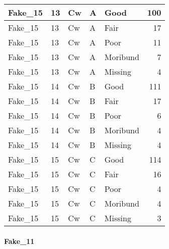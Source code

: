 \documentclass[
]{article}
\begin{document}
\begin{tabular}{l|l|l|l|l|r}
\hline
Fake\_15 & 13 & Cw & A & Good & 100\\
\hline
Fake\_15 & 13 & Cw & A & Fair & 17\\
\hline
Fake\_15 & 13 & Cw & A & Poor & 11\\
\hline
Fake\_15 & 13 & Cw & A & Moribund & 7\\
\hline
Fake\_15 & 13 & Cw & A & Missing & 4\\
\hline
Fake\_15 & 14 & Cw & B & Good & 111\\
\hline
Fake\_15 & 14 & Cw & B & Fair & 17\\
\hline
Fake\_15 & 14 & Cw & B & Poor & 6\\
\hline
Fake\_15 & 14 & Cw & B & Moribund & 4\\
\hline
Fake\_15 & 14 & Cw & B & Missing & 4\\
\hline
Fake\_15 & 15 & Cw & C & Good & 114\\
\hline
Fake\_15 & 15 & Cw & C & Fair & 16\\
\hline
Fake\_15 & 15 & Cw & C & Poor & 4\\
\hline
Fake\_15 & 15 & Cw & C & Moribund & 4\\
\hline
Fake\_15 & 15 & Cw & C & Missing & 3\\
\hline
\end{tabular}

\hypertarget{fake_11-1}{%
\paragraph{Fake\_11}\label{fake_11-1}}
\end{document}
